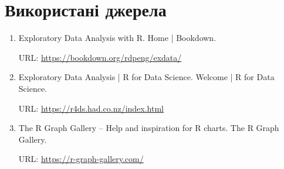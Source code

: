 \documentclass{article}
\begin{document}
\newpage
\section{Використані джерела}
\begin{enumerate}
    \item Exploratory Data Analysis with R. Home | Bookdown. 
    
    URL:  \href{https://bookdown.org/rdpeng/exdata/}{https://bookdown.org/rdpeng/exdata/}
    
    \item Exploratory Data Analysis | R for Data Science. Welcome | R for Data Science.
    
    URL: \href{https://r4ds.had.co.nz/index.html}{https://r4ds.had.co.nz/index.html}
    \item The R Graph Gallery – Help and inspiration for R charts. The R Graph Gallery. 
    
    URL: \href{ https://r-graph-gallery.com/}{ https://r-graph-gallery.com/ }
\end{enumerate}
\end{document}
